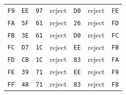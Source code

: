 \begin{longtable}{lllllll}
\texttt{F9} & \texttt{EE} & \texttt{97} & reject & \texttt{D0} & reject & \texttt{FE}\\
\texttt{FA} & \texttt{5F} & \texttt{61} & reject & \texttt{26} & reject & \texttt{FD}\\
\texttt{FB} & \texttt{3E} & \texttt{61} & reject & \texttt{D0} & reject & \texttt{FC}\\
\texttt{FC} & \texttt{D7} & \texttt{1C} & reject & \texttt{EE} & reject & \texttt{FB}\\
\texttt{FD} & \texttt{CB} & \texttt{1C} & reject & \texttt{83} & reject & \texttt{FA}\\
\texttt{FE} & \texttt{39} & \texttt{71} & reject & \texttt{EE} & reject & \texttt{F9}\\
\texttt{FF} & \texttt{48} & \texttt{71} & reject & \texttt{83} & reject & \texttt{F8}\\
\bottomrule
\end{longtable}
\endgroup
